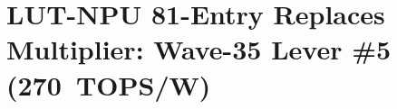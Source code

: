 %
%

\chapter{LUT-NPU 81-Entry Replaces Multiplier: Wave-35 Lever \#5 (270~TOPS/W)}%
\label{ch:lut-npu-wave35}

